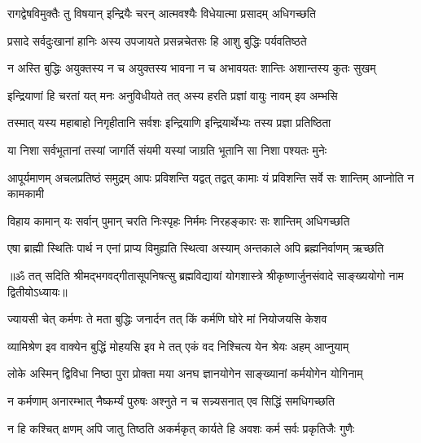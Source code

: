 \twolineshloka
{रागद्वेषविमुक्तैः तु विषयान् इन्द्रियैः चरन्}
{आत्मवश्यैः विधेयात्मा प्रसादम् अधिगच्छति}%

\twolineshloka
{प्रसादे सर्वदुःखानां हानिः अस्य उपजायते}
{प्रसन्नचेतसः हि आशु बुद्धिः पर्यवतिष्ठते}%

\twolineshloka
{न अस्ति बुद्धिः अयुक्तस्य न च अयुक्तस्य भावना}
{न च अभावयतः शान्तिः अशान्तस्य कुतः सुखम्}%

\twolineshloka
{इन्द्रियाणां हि चरतां यत् मनः अनुविधीयते}
{तत् अस्य हरति प्रज्ञां वायुः नावम् इव अम्भसि}%

\twolineshloka
{तस्मात् यस्य महाबाहो निगृहीतानि सर्वशः}
{इन्द्रियाणि इन्द्रियार्थेभ्यः तस्य प्रज्ञा प्रतिष्ठिता}%

\twolineshloka
{या निशा सर्वभूतानां तस्यां जागर्ति संयमी}
{यस्यां जाग्रति भूतानि सा निशा पश्यतः मुनेः}%

\fourlineindentedshloka
{आपूर्यमाणम् अचलप्रतिष्ठं}
{समुद्रम् आपः प्रविशन्ति यद्वत्}
{तद्वत् कामाः यं प्रविशन्ति सर्वे}
{सः शान्तिम् आप्नोति न कामकामी}%

\twolineshloka
{विहाय कामान् यः सर्वान् पुमान् चरति निःस्पृहः}
{निर्ममः निरहङ्कारः सः शान्तिम् अधिगच्छति}%

\twolineshloka
{एषा ब्राह्मी स्थितिः पार्थ न एनां प्राप्य विमुह्यति}
{स्थित्वा अस्याम् अन्तकाले अपि ब्रह्मनिर्वाणम् ऋच्छति}%

{॥ॐ तत् सदिति श्रीमद्भगवद्गीतासूपनिषत्सु ब्रह्मविद्यायां योगशास्त्रे श्रीकृष्णार्जुनसंवादे साङ्ख्ययोगो नाम द्वितीयोऽध्यायः॥}



\twolineshloka
{ज्यायसी चेत् कर्मणः ते मता बुद्धिः जनार्दन}
{तत् किं कर्मणि घोरे मां नियोजयसि केशव}%

\twolineshloka
{व्यामिश्रेण इव वाक्येन बुद्धिं मोहयसि इव मे}
{तत् एकं वद निश्चित्य येन श्रेयः अहम् आप्नुयाम्}%


\twolineshloka
{लोके अस्मिन् द्विविधा निष्ठा पुरा प्रोक्ता मया अनघ}
{ज्ञानयोगेन साङ्ख्यानां कर्मयोगेन योगिनाम्}%

\twolineshloka
{न कर्मणाम् अनारम्भात् नैष्कर्म्यं पुरुषः अश्नुते}
{न च सन्न्यसनात् एव सिद्धिं समधिगच्छति}%

\twolineshloka
{न हि कश्चित् क्षणम् अपि जातु तिष्ठति अकर्मकृत्}
{कार्यते हि अवशः कर्म सर्वः प्रकृतिजैः गुणैः}%

